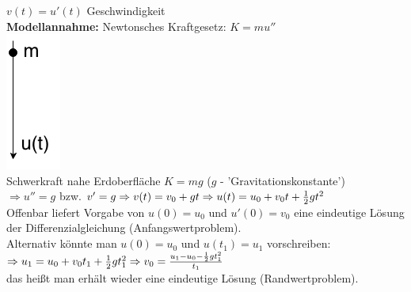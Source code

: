 \begin{beispiel}

$v(t) = u'(t) $ Geschwindigkeit\\

\textbf{Modellannahme:} Newtonsches Kraftgesetz: $K = m u'' $\\
\includegraphics[scale=0.5]{pictures/011-03.png}\\                            
Schwerkraft nahe Erdoberfläche $K = mg$ ($g$ - 'Gravitationskonstante')\\
$\Rightarrow u'' = g $ bzw. $v' = g \\
\Rightarrow v(t) = v_0 + gt \\
\Rightarrow u(t) = u_0 + v_0 t + \frac{1}{2} g t^2 $\\
Offenbar liefert Vorgabe von $u(0) = u_0 $ und $u'(0) = v_0 $ eine eindeutige Lösung
der Differenzialgleichung (Anfangswertproblem).\\
Alternativ könnte man $u(0) = u_0 $ und $u(t_1) = u_1 $ vorschreiben:\\
$\Rightarrow u_1 = u_0 + v_0 t_1 + \frac{1}{2} g t_1^2 \\
\Rightarrow v_0 = \frac{u_1 - u_0 - \frac{1}{2} g t_1^2}{t_1} $\\
das heißt man erhält wieder eine eindeutige Lösung (Randwertproblem).
\end{beispiel}

